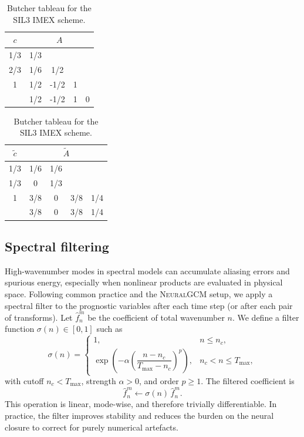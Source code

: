 \begin{table}[h]
    \centering
    \label{tab:sil3_tableau}
    \begin{tabular}{c|cccc}
        $c$ & \multicolumn{4}{c}{$A$} \\ \hline
        1/3 & 1/3 & & & \\
        2/3 & 1/6 & 1/2 & & \\
        1   & 1/2 & -1/2 & 1 & \\ \hline
            & 1/2 & -1/2 & 1 & 0
    \end{tabular}
    \qquad
    \begin{tabular}{c|cccc}
        $\tilde{c}$ & \multicolumn{4}{c}{$\tilde{A}$} \\ \hline
        1/3 & 1/6 & 1/6 & & \\
        1/3 & 0   & 1/3 & & \\
        1   & 3/8 & 0   & 3/8 & 1/4 \\ \hline
            & 3/8 & 0   & 3/8 & 1/4
    \end{tabular}
    \caption{Butcher tableau for the SIL3 IMEX scheme.}
\end{table}

\subsection{Spectral filtering}
\label{subsec:filtering}
High-wavenumber modes in spectral models can accumulate aliasing errors and spurious energy, especially when nonlinear products are evaluated in physical space. Following common practice and the \textsc{NeuralGCM} setup, we apply a spectral filter to the prognostic variables after each time step (or after each pair of transforms). Let $\hat{f}_{n}^{m}$ be the coefficient of total wavenumber $n$. We define a filter function $\sigma(n) \in [0,1]$ such as
\begin{equation}
  \sigma(n) =
  \begin{cases}
    1, & n \le n_c, \\
    \exp\left( -\alpha \left( \dfrac{n - n_c}{T_{\max} - n_c} \right)^p \right), & n_c < n \le T_{\max},
  \end{cases}
\end{equation}
with cutoff $n_c < T_{\max}$, strength $\alpha>0$, and order $p \ge 1$. The filtered coefficient is
\begin{equation}
  \hat{f}_{n}^{m} \leftarrow \sigma(n) \, \hat{f}_{n}^{m}.
\end{equation}
This operation is linear, mode-wise, and therefore trivially differentiable. In practice, the filter improves stability and reduces the burden on the neural closure to correct for purely numerical artefacts.

